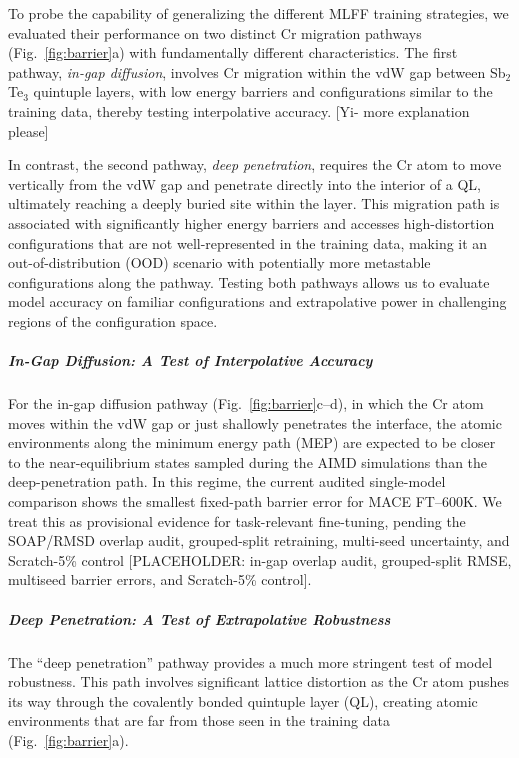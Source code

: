 \documentclass[pdflatex,sn-mathphys-num]{sn-jnl}%
\theoremstyle{thmstyleone}%
\theoremstyle{thmstyletwo}%
\theoremstyle{thmstylethree}%
\begin{document}

To probe the capability of generalizing the different MLFF training strategies, we evaluated their performance on two distinct Cr migration pathways (Fig.~\ref{fig:barrier}a) with fundamentally different characteristics. The first pathway, \emph{in-gap diffusion}, involves Cr migration within the vdW gap between Sb$_2$Te$_3$ quintuple layers, with low energy barriers and configurations similar to the training data, thereby testing interpolative accuracy. [Yi- more explanation please]

In contrast, the second pathway, \emph{deep penetration}, requires the Cr atom to move vertically from the vdW gap and penetrate directly into the interior of a QL, ultimately reaching a deeply buried site within the layer. This migration path is associated with significantly higher energy barriers and accesses high-distortion configurations that are not well-represented in the training data, making it an out-of-distribution (OOD) scenario with potentially more metastable configurations along the pathway. Testing both pathways allows us to evaluate model accuracy on familiar configurations and extrapolative power in challenging regions of the configuration space.


\subparagraph{In-Gap Diffusion: A Test of Interpolative Accuracy}

For the in-gap diffusion pathway (Fig.~\ref{fig:barrier}c--d), in which the Cr atom moves within the vdW gap or just shallowly penetrates the interface, the atomic environments along the minimum energy path (MEP) are expected to be closer to the near-equilibrium states sampled during the AIMD simulations than the deep-penetration path. In this regime, the current audited single-model comparison shows the smallest fixed-path barrier error for MACE FT--600K. We treat this as provisional evidence for task-relevant fine-tuning, pending the SOAP/RMSD overlap audit, grouped-split retraining, multi-seed uncertainty, and Scratch-5\% control [PLACEHOLDER: in-gap overlap audit, grouped-split RMSE, multiseed barrier errors, and Scratch-5\% control].

\subparagraph{Deep Penetration: A Test of Extrapolative Robustness}

The ``deep penetration'' pathway provides a much more stringent test of model robustness. This path involves significant lattice distortion as the Cr atom pushes its way through the covalently bonded quintuple layer (QL), creating atomic environments that are far from those seen in the training data (Fig.~\ref{fig:barrier}a).
\end{document}
